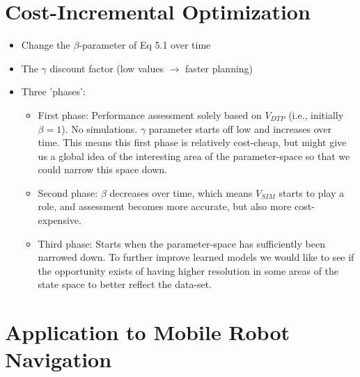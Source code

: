 

\section{Cost-Incremental Optimization}
\label{sec:cost-effective-optimization}

\begin{itemize}
	\item Change the $\beta$-parameter of Eq 5.1 over time
	\item The $\gamma$ discount factor (low values $\to$ faster planning)
	\item Three 'phases':
	\begin{itemize}
		\item First phase: Performance assessment solely based on $V_\mathit{DTP}$ (i.e., initially $\beta = 1$). No simulations. $\gamma$ parameter starts off low and increases over time. This means this first phase is relatively cost-cheap, but might give us a global idea of the interesting area of the parameter-space so that we could narrow this space down.
		\item Second phase: $\beta$ decreases over time, which means $V_\mathit{SIM}$ starts to play a role, and assessment becomes more accurate, but also more cost-expensive.
		\item Third phase: Starts when the parameter-space has sufficiently been narrowed down. To further improve learned models we would like to see if the opportunity exists of having higher resolution in some areas of the state space to better reflect the data-set.
	\end{itemize}
\end{itemize}

\section{Application to Mobile Robot Navigation}
\label{sec:application-mobile-robot}

